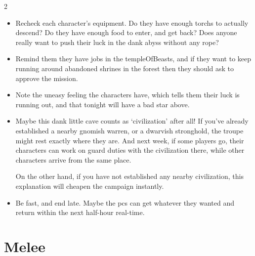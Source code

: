 \begin{multicols}{2}
\begin{itemize}
  \item
  Recheck each character's equipment.
  Do they have enough \glspl{torch} to actually descend?
  Do they have enough food to enter, and get back?
  Does anyone really want to push their luck in the dank abyss without any rope?
  \item
  Remind them they have jobs in the \gls{templeOfBeasts}, and if they want to keep running around abandoned shrines in the forest then they should ask  to approve the mission.
  \item
  Note the uneasy feeling the characters have, which tells them their luck is running out, and that tonight will have a bad star above.
  \item
  Maybe this dank little cave counts as `civilization' after all!
  If you've already established a nearby gnomish warren, or a dwarvish stronghold, the troupe might rest exactly where they are.
  And next week, if some players go, their characters can work on \gls{guard} duties with the civilization there, while other characters arrive from the same place.

  On the other hand, if you have not established any nearby civilization, this explanation will cheapen the \gls{campaign} instantly.
  \item
  Be fast, and end late.
  Maybe the \glspl{pc} can get whatever they wanted and return within the next half-hour real-time.
\end{itemize}

\end{multicols}

\bigbreak

\section{Melee}

